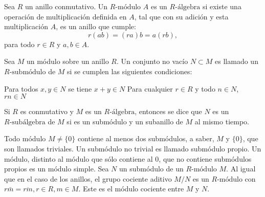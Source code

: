 \begin{definicion}
Sea $R$ un anillo conmutativo. Un $R\mbox{-módulo}$ $A$ es un $R\mbox{-álgebra}$ si existe una operación de multiplicación definida en $A$, tal que con su adición y esta multiplicación $A$, es un anillo que cumple: \[ r(ab) = (ra)b = a(rb), \] para todo $r \in R$ y $a,b \in A$.
\end{definicion}
\begin{definicion}
Sea $M$ un módulo sobre un anillo $R$. Un conjunto no vacío $N \subset M$ es llamado un $R\mbox{-submódulo}$ de $M$ si se cumplen las siguientes condiciones:
\begin{bulletList}
\newItem Para todos $x,y \in N$ se tiene $x + y \in N$
\newItem Para cualquier $r \in R$ y todo $n \in N$, $rn \in N$
\end{bulletList}
Si $R$ es conmutativo y $M$ es un $R\mbox{-álgebra}$, entonces  se dice que $N$ es un $R\mbox{-subálgebra}$ de $M$ si es un submódulo y un subanillo de $M$ al mismo tiempo. 
\end{definicion}
Todo módulo $M \neq \{0\}$ contiene al menos dos submódulos, a saber, $M$ y $\{0\}$, que son llamados triviales. Un submódulo no trivial es llamado submódulo propio. Un módulo, distinto al módulo que sólo contiene al $0$, que no contiene submódulos propios es un  módulo simple. 
Sea $N$ un submódulo de un $R\mbox{-módulo}$ $M$. Al igual que en el caso de los anillos, el grupo cociente aditivo $M/N$ es un $R\mbox{-módulo}$ con $r\bar{m} = \overline{rm}, r\in R, m \in M$. Este es el módulo cociente entre $M$ y $N$. 

